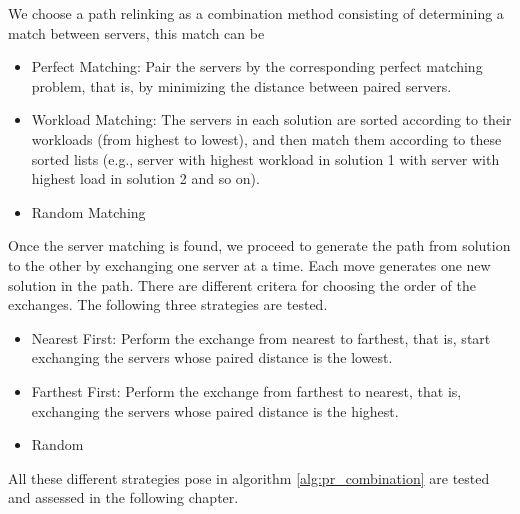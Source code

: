 We choose a path relinking as a combination method
consisting of
determining a match between servers,
this match can be
\begin{itemize}
\item Perfect Matching:
  Pair the servers by the corresponding perfect matching problem,
  that is,
  by minimizing the distance between paired servers.
\item Workload Matching:
  The servers in each solution
  are sorted according to their workloads
  (from highest to lowest),
  and then
  match them according to these sorted lists
  (e.g.,
  server with highest workload in solution 1
  with server with highest load in solution 2
  and so on).
\item Random Matching
\end{itemize}
Once the server matching is found,
we proceed to generate the path
from solution to the other
by exchanging one server at a time.
Each move generates one new solution in the path.
There are different critera
for choosing the order of the exchanges.
The following three strategies are tested.
\begin{itemize}
\item Nearest First:
  Perform the exchange
  from nearest to farthest,
  that is,
  start exchanging the servers
  whose paired distance
  is the lowest.
\item Farthest First:
  Perform the exchange from farthest to nearest,
  that is,
  exchanging the servers
  whose paired distance
  is the highest.
\item Random
\end{itemize}

All these different strategies
pose in algorithm \ref{alg:pr_combination}
are tested and assessed
in the following chapter.
